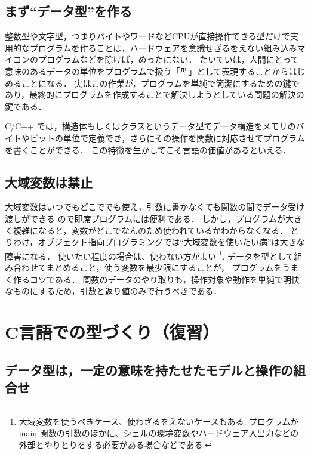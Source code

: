 \documentclass[11pt,a4,epsf]{jarticle}
\begin{document}
\subsection{まず``データ型''を作る}

整数型や文字型，つまりバイトやワードなどCPUが直接操作できる型だけで実用的なプログラムを作ることは，ハードウェアを意識せざるをえない組み込みマイコンのプログラムなどを除けば，めったにない．
たいていは，人間にとって意味のあるデータの単位をプログラムで扱う「型」として表現することからはじめることになる．
実はこの作業が，プログラムを単純で簡潔にするための鍵であり，最終的にプログラムを作成することで解決しようとしている問題の解決の鍵である．

C/C++ では，構造体もしくはクラスというデータ型でデータ構造をメモリのバイトやビットの単位で定義でき，さらにその操作を関数に対応させてプログラムを書くことができる．
この特徴を生かしてこそ言語の価値があるといえる．



\subsection{大域変数は禁止}
大域変数はいつでもどこででも使え，引数に書かなくても関数の間でデータ受け渡しができる
ので即席プログラムには便利である．
しかし，プログラムが大きく複雑になると，変数がどこでなんのため使われているかわからなくなる．
とりわけ，オブジェクト指向プログラミングでは``大域変数を使いたい病''は大きな障害になる．
使いたい程度の場合は、使わない方がよい
\footnote{大域変数を使うべきケース、使わざるをえないケースもある.
プログラムが main 関数の引数のほかに、シェルの環境変数やハードウェア入出力などの外部とやりとりをする必要がある場合などである.}.
データを型として組み合わせてまとめること，使う変数を最少限にすることが，
プログラムをうまく作るコツである．
関数のデータのやり取りも，操作対象や動作を単純で明快なものにするため，引数と返り値のみで行うべきである．



\section{C言語での型づくり（復習）}

\subsection{データ型は，一定の意味を持たせたモデルと操作の組合せ} %
\end{document}
